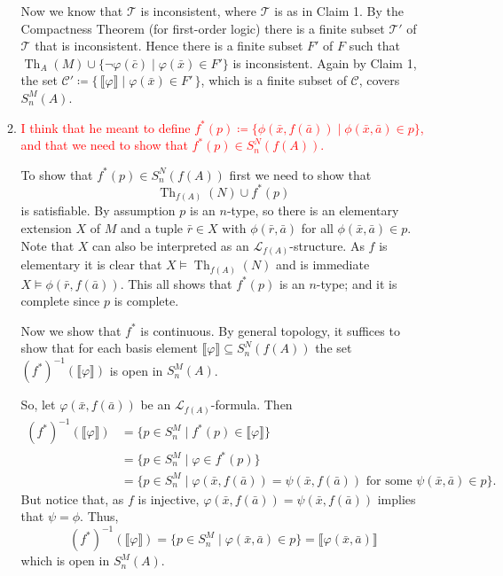 \documentclass{article}
\theoremstyle{theorem}
\DeclareMathOperator{\Th}{Th}
\begin{document}
\begin{enumerate}[leftmargin=*]
\begin{enumerate}
			Now we know that $\mathcal{T}$ is inconsistent, where $\mathcal{T}$ is as in Claim 1. By the Compactness Theorem (for first-order logic) there is a finite subset $\mathcal{T}'$ of $\mathcal{T}$ that is inconsistent. Hence there is a finite subset $F'$ of $F$ such that $\Th_A(M)\cup \{\neg\varphi(\bar{c}) \mid \varphi(\bar{x})\in F'\}$ is inconsistent. Again by Claim 1, the set $\mathcal{C}'\coloneqq \{\,\llbracket\varphi\rrbracket \mid \varphi(\bar{x}) \in F'\,\}$, which is a finite subset of $\mathcal{C}$, covers $S_n^M(A)$.
			\item \textcolor{red}{I think that he meant to define $f^*(p)\coloneqq \{\phi(\bar{x},f(\bar{a}))\mid \phi(\bar{x},\bar{a})\in p\}$, and that we need to show that $f^*(p)\in S_n^N(f(A))$.}
			
			To show that $f^*(p)\in S_n^N(f(A))$ first we need to show that 
			\[
				\Th_{f(A)}(N) \cup f^*(p)
			\]
			is satisfiable. By assumption $p$ is an $n$-type, so there is an elementary extension $X$ of $M$ and a tuple $\bar{r}\in X$ with $\phi(\bar{r},\bar{a})$ for all $\phi(\bar{x},\bar{a})\in p$. Note that $X$ can also be interpreted as an $\mathcal{L}_{f(A)}$-structure. As $f$ is elementary it is clear that $X\models \Th_{f(A)}(N)$ and is immediate $X\models \phi(\bar{r},f(\bar{a}))$. This all shows that $f^*(p)$ is an $n$-type; and it is complete since $p$ is complete.
			
			Now we show that $f^*$ is continuous. By general topology, it suffices to show that for each basis element $\llbracket \varphi\rrbracket\subseteq S_n^{N}(f(A))$ the set $(f^*)^{-1}(\llbracket \varphi\rrbracket)$ is open in $S_n^M(A)$.
			
			So, let $\varphi(\bar{x},f(\bar{a}))$ be an $\mathcal{L}_{f(A)}$-formula. Then
			\begin{align*}
				(f^*)^{-1}(\llbracket \varphi\rrbracket) &= \{p\in S_n^M \mid f^*(p)\in \llbracket \varphi\rrbracket\}\\
				&= \{p\in S_n^M \mid \varphi\in f^*(p)\}\\
				&= \{p\in S_n^M \mid \varphi(\bar{x},f(\bar{a}))= \psi(\bar{x}, f(\bar{a})) \text{ for some }\psi(\bar{x},\bar{a})\in p\}.
			\end{align*}
			But notice that, as $f$ is injective, $\varphi(\bar{x},f(\bar{a}))= \psi(\bar{x}, f(\bar{a}))$ implies that $\psi = \phi$. Thus,
			\[
				(f^*)^{-1}(\llbracket \varphi\rrbracket) = \{p\in S_n^M \mid \varphi(\bar{x},\bar{a})\in p\} = \llbracket \varphi(\bar{x},\bar{a})\rrbracket
			\] 
			which is open in $S_n^M(A)$.
		\end{enumerate}
		
	\end{enumerate}
\end{document}
